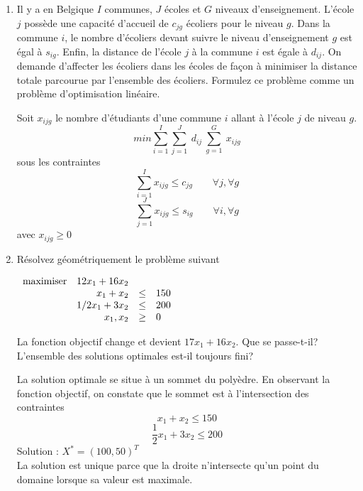 \begin{enumerate}
\begin{solution}
    \end{solution}


  \item Il y a en Belgique $I$ communes, $J$ écoles et $G$ niveaux
    d'enseignement. L'école $j$ possède  une capacité d'accueil de $c_{jg}$
    écoliers pour le niveau $g$. Dans la commune $i$, le nombre d'écoliers devant
    suivre le niveau d'enseignement $g$ est égal à $s_{ig}$. Enfin, la distance de
    l'école $j$ à la commune $i$ est égale à $d_{ij}$. On demande d'affecter les écoliers dans les écoles de façon à minimiser la
    distance totale parcourue par l'ensemble des écoliers. Formulez ce problème comme un problème d'optimisation linéaire.


    \begin{solution}
      Soit $x_{ijg}$ le nombre d'étudiants d'une commune $i$ allant à l'école $j$ de niveau $g$. \\
      \newline
      $$ min \sum_{i=1}^I \sum_{j=1}^J~d_{ij}~\sum_{g=1}^G~x_{ijg} $$
      sous les contraintes
      $$ \sum_{i=1}^I x_{ijg} \le c_{jg} \qquad \forall j, \forall g$$
      $$ \sum_{j=1}^J x_{ijg} \le s_{ig} \qquad \forall i, \forall g$$
      avec $x_{ijg} \geq 0$
    \end{solution}


  \item Résolvez géométriquement le problème suivant

    $
    \begin{array}{lrcl}
      \mbox{maximiser} & 12 x_1+16 x_2\\
      & x_1 + x_2 & \leq & 150\\
      & 1/2 x_1 + 3x_2 & \leq & 200\\
      & x_1, x_2 & \geq & 0
    \end{array}
    $

    La fonction objectif change et devient $17 x_1+16 x_2$. Que se passe-t-il? L'ensemble des solutions optimales est-il toujours fini?
    \begin{solution}
      La solution optimale se situe à un sommet du polyèdre. En observant la fonction objectif, on constate que le sommet est à l'intersection des contraintes 
      $$ x_{1} + x_{2} \le 150$$
      $$ \frac{1}{2}x_{1} + 3x_{2} \le 200$$ 
      Solution : $X^{*} = (100,50)^{T}$\\
      \newline
      La solution est unique parce que la droite n'intersecte qu'un point du domaine lorsque sa valeur est maximale. 
    \end{solution}



\end{enumerate}
